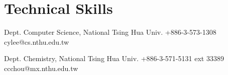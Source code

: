 \documentclass{cvclass}
\begin{document}


\section{Technical Skills}

\begin{plainitemize}{}
\end{plainitemize}


\begin{references}

    {Dept. Computer Science, National Tsing Hua Univ.}
    {+886-3-573-1308}
    {cylee@cs.nthu.edu.tw}

    {Dept. Chemistry, National Tsing Hua Univ.}
    {+886-3-571-5131 ext 33389}
    {ccchou@mx.nthu.edu.tw}

\end{references}
\end{document}
